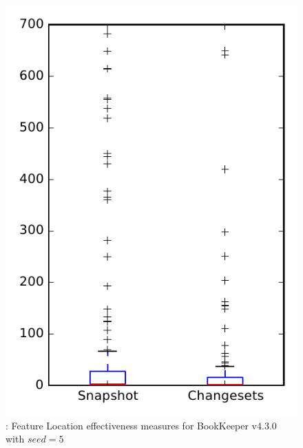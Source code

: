 
\begin{figure}
\centering
\includegraphics[height=0.4\textheight]{figures/flt_seed/rq1_bookkeeper_5}
\caption{\rone: Feature Location effectiveness measures for BookKeeper v4.3.0 with $seed=5$}
\label{fig:flt_seed:rq1:bookkeeper}
\end{figure}
